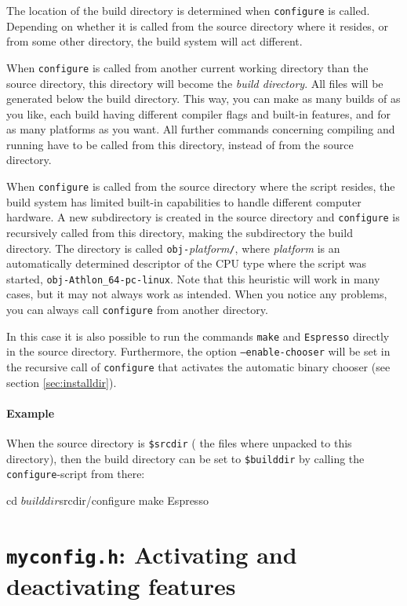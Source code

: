 The location of the build directory is determined when
\texttt{configure} is called.  Depending on whether it is called from
the source directory where it resides, or from some other directory,
the build system will act different.

When \texttt{configure} is called from another current working
directory than the source directory, this directory will become the
\emph{build directory}.  All files will be generated below the build
directory.  This way, you can make as many builds of \es as you like,
each build having different compiler flags and built-in features, and
for as many platforms as you want.  All further commands concerning
compiling and running \es{} have to be called from this directory,
instead of from the source directory.

When \texttt{configure} is called from the source directory where the
script resides, the \es build system has limited built-in capabilities
to handle different computer hardware.  A new subdirectory is created
in the source directory and \texttt{configure} is recursively called
from this directory, making the subdirectory the build directory.  The
directory is called \texttt{obj-}\textit{platform}\texttt{/}, where
\textit{platform} is an automatically determined descriptor of the CPU
type where the script was started, \eg
\mbox{\texttt{obj-Athlon\_64-pc-linux}}.  Note that this heuristic
will work in many cases, but it may not always work as intended.  When
you notice any problems, you can always call \texttt{configure} from
another directory.

In this case it is also possible to run the commands \texttt{make} and
\texttt{Espresso} directly in the source directory.  Furthermore, the
option \texttt{--enable-chooser} will be set in the recursive call of
\texttt{configure} that activates the automatic binary chooser (see
section \vref{sec:installdir}).

\paragraph{Example}
When the source directory is \texttt{\$srcdir} (\ie{} the files where
unpacked to this directory), then the build directory can be set to
\texttt{\$builddir} by calling the \texttt{configure}-script from
there:
\begin{code}
cd $builddir
$srcdir/configure
make
Espresso
\end{code}

\section{\texttt{myconfig.h}: Activating and deactivating features}
\label{sec:myconfig}

